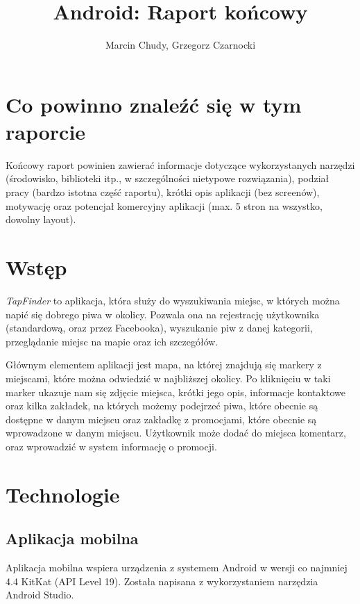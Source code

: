 \documentclass[a4paper]{article}
\title{Android: Raport końcowy}
\author{Marcin Chudy, Grzegorz Czarnocki}
\begin{document}
\maketitle

\section{Co powinno znaleźć się w tym raporcie}

Końcowy raport powinien zawierać informacje dotyczące wykorzystanych narzędzi (środowisko, biblioteki itp., w szczególności nietypowe rozwiązania), podział pracy (bardzo istotna część raportu), krótki opis aplikacji (bez screenów), motywację oraz potencjał komercyjny aplikacji (max. 5 stron na wszystko, dowolny layout).

\section{Wstęp}

\textit{TapFinder} to aplikacja, która służy do wyszukiwania miejsc, w których można napić się dobrego piwa w okolicy. Pozwala ona na rejestrację użytkownika (standardową, oraz przez Facebooka), wyszukanie piw z danej kategorii, przeglądanie miejsc na mapie oraz ich szczegółów.

Głównym elementem aplikacji jest mapa, na której znajdują się markery z miejscami, które można odwiedzić w najbliższej okolicy. Po kliknięciu w taki marker ukazuje nam się zdjęcie miejsca, krótki jego opis, informacje kontaktowe oraz kilka zakładek, na których możemy podejrzeć piwa, które obecnie są dostępne w danym miejscu oraz zakładkę z promocjami, które obecnie są wprowadzone w danym miejscu. Użytkownik może dodać do miejsca komentarz, oraz wprowadzić w system informację o promocji.

\section{Technologie}

\subsection{Aplikacja mobilna}
Aplikacja mobilna wspiera urządzenia z systemem Android w wersji co najmniej 4.4 KitKat (API Level 19). Została napisana z wykorzystaniem narzędzia Android Studio.
\end{document}
